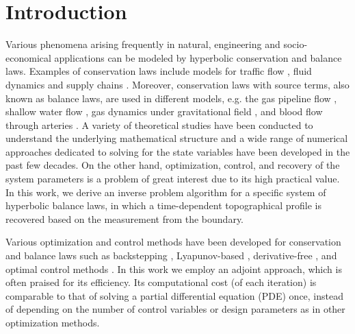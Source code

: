 \section{Introduction} \label{sec_intro}

Various phenomena arising frequently in natural, engineering and socio-economical applications can be modeled by hyperbolic conservation and balance laws. Examples of conservation laws include models for traffic flow \cite{Garavello2006TrafficModel}, fluid dynamics \cite{Eiseman1980ConservationSurvey} and supply chains \cite{Brunnermeier2002InteroperabilityChain}. Moreover, conservation laws with source terms, also known as balance laws, are used in different models, e.g. the gas pipeline flow \cite{Gugat2011GasStabilization}, shallow water flow \cite{Xing2017NumericalEquations, Kurganov2018Finite-volumeEquations}, gas dynamics under gravitational field \cite{Xing2013HighFields}, and blood flow through arteries \cite{Young1808XIII.Blood}. A variety of theoretical studies have been conducted to understand the underlying mathematical structure and a wide range of numerical approaches dedicated to solving for the state variables have been developed in the past few decades. On the other hand, optimization, control, and recovery of the system parameters is a problem of great interest due to its high practical value. In this work, we derive an inverse problem algorithm for a specific system of hyperbolic balance laws, in which a time-dependent topographical profile is recovered based on the measurement from the boundary.

Various optimization and control methods have been developed for conservation and balance laws such as backstepping \cite{Vazquez2011LocalBackstepping,Glass2007OnEquation}, Lyapunov-based \cite{Vazquez2011LocalBackstepping}, derivative-free  \cite{Larson2019Derivative-freeMethods}, and optimal control methods \cite{Jacquet2006OptimalLaws}. In this work we employ an adjoint approach, which is often praised for its efficiency. Its computational cost (of each iteration) is comparable to that of solving a  partial differential equation (PDE) once, instead of depending on the number of control variables or design parameters as in other optimization methods.%

